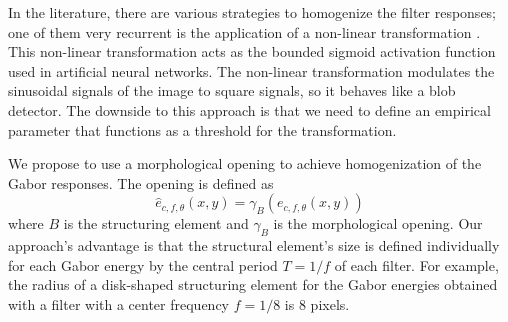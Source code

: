 \documentclass[journal]{IEEEtran}
\newcommand{\RE}{\mathrm{Re}}
\newcommand{\IM}{\mathrm{Im}}
\newcommand{\captext}[1]{\small{\textbf{\textsf{#1}}}}
\begin{document}
In the literature, there are various strategies to homogenize the filter responses; one of them very recurrent is the application of a non-linear transformation \cite{Jain.Farrokhnia:IJPR:1991}. This non-linear transformation acts as the bounded sigmoid activation function used in artificial neural networks. The non-linear transformation modulates the sinusoidal signals of the image to square signals, so it behaves like a blob detector. The downside to this approach is that we need to define an empirical parameter that functions as a threshold for the transformation.

We propose to use a morphological opening to achieve homogenization of the Gabor responses. The opening is defined as
\begin{equation}\label{eq:gabor_energy_opn}
	\widehat{e}_{c, f, \theta}(x,y) = \gamma_B(e_{c, f, \theta}(x,y)) 
\end{equation}
where $B$ is the structuring element and $\gamma_B$ is the morphological opening. Our approach's advantage is that the structural element's size is defined individually for each Gabor energy by the central period $ T=1 / f $ of each filter. For example, the radius of a disk-shaped structuring element for the Gabor energies obtained with a filter with a center frequency $ f = 1/8 $ is 8 pixels. 
%    	    
\end{document}
